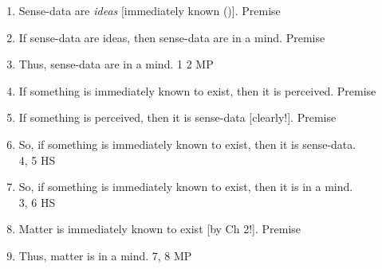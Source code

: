 \documentclass[oneside,letterpaper,12pt]{book}
\begin{document}
\begin{enumerate}%
	\item Sense-data are \textit{ideas} [immediately known (\pageref{ideas})]. \hfill Premise
	\item If sense-data are ideas, then sense-data are in a mind. \hfill Premise
	\item Thus, sense-data are in a mind. \hfill 1 2 MP
	\item If something is immediately known to exist, then it is perceived. \hspace{.25cm} Premise
	\item If something is perceived, then it is sense-data [clearly!]. \hfill Premise
	\item So, if something is immediately known to exist, then it is sense-data. \\ \text{ } \hfill 4, 5 HS
	\item So, if something is immediately known to exist, then it is in a mind. \\ \text{ } \hfill  3, 6 HS
	\item Matter is immediately known to exist [by Ch 2!]. \hfill Premise
	\item Thus, matter is in a mind. \hfill 7, 8 MP
\end{enumerate}
\end{document}
